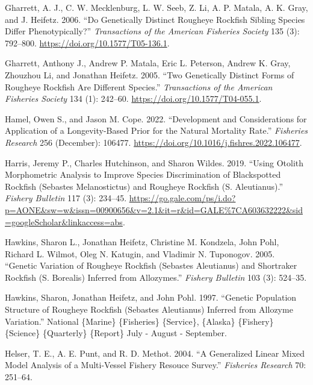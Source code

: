 \documentclass[
]{scrartcl}
\newlength{\cslhangindent}
\newenvironment{CSLReferences}[2] %
 {\begin{list}{}{%
  \setlength{\itemindent}{0pt}
  \setlength{\leftmargin}{0pt}
  \setlength{\parsep}{0pt}
  \ifodd #1
   \setlength{\leftmargin}{\cslhangindent}
   \setlength{\itemindent}{-1\cslhangindent}
  \fi
  \setlength{\itemsep}{#2\baselineskip}}}
 {\end{list}}
\begin{document}
\begin{CSLReferences}{1}{0}
Gharrett, A. J., C. W. Mecklenburg, L. W. Seeb, Z. Li, A. P. Matala, A.
K. Gray, and J. Heifetz. 2006. {``Do {Genetically} {Distinct} {Rougheye}
{Rockfish} {Sibling} {Species} {Differ} {Phenotypically}?''}
\emph{Transactions of the American Fisheries Society} 135 (3): 792--800.
\url{https://doi.org/10.1577/T05-136.1}.

Gharrett, Anthony J., Andrew P. Matala, Eric L. Peterson, Andrew K.
Gray, Zhouzhou Li, and Jonathan Heifetz. 2005. {``Two {Genetically}
{Distinct} {Forms} of {Rougheye} {Rockfish} {Are} {Different}
{Species}.''} \emph{Transactions of the American Fisheries Society} 134
(1): 242--60. \url{https://doi.org/10.1577/T04-055.1}.

Hamel, Owen S., and Jason M. Cope. 2022. {``Development and
Considerations for Application of a Longevity-Based Prior for the
Natural Mortality Rate.''} \emph{Fisheries Research} 256 (December):
106477. \url{https://doi.org/10.1016/j.fishres.2022.106477}.

Harris, Jeremy P., Charles Hutchinson, and Sharon Wildes. 2019. {``Using
Otolith Morphometric Analysis to Improve Species Discrimination of
Blackspotted Rockfish ({Sebastes} Melanostictus) and Rougheye Rockfish
({S}. Aleutianus).''} \emph{Fishery Bulletin} 117 (3): 234--45.
\url{https://go.gale.com/ps/i.do?p=AONE&sw=w&issn=00900656&v=2.1&it=r&id=GALE\%7CA603632222&sid=googleScholar&linkaccess=abs}.

Hawkins, Sharon L., Jonathan Heifetz, Christine M. Kondzela, John Pohl,
Richard L. Wilmot, Oleg N. Katugin, and Vladimir N. Tuponogov. 2005.
{``Genetic Variation of Rougheye Rockfish ({Sebastes} Aleutianus) and
Shortraker Rockfish ({S}. Borealis) Inferred from Allozymes.''}
\emph{Fishery Bulletin} 103 (3): 524--35.

Hawkins, Sharon, Jonathan Heifetz, and John Pohl. 1997. {``Genetic
Population Structure of Rougheye Rockfish ({Sebastes} Aleutianus)
Inferred from Allozyme Variation.''} National \{Marine\} \{Fisheries\}
\{Service\}, \{Alaska\} \{Fishery\} \{Science\} \{Quarterly\} \{Report\}
July - August - September.

Helser, T. E., A. E. Punt, and R. D. Methot. 2004. {``A Generalized
Linear Mixed Model Analysis of a Multi-Vessel Fishery Resouce Survey.''}
\emph{Fisheries Research} 70: 251--64.


\end{CSLReferences}
\end{document}
